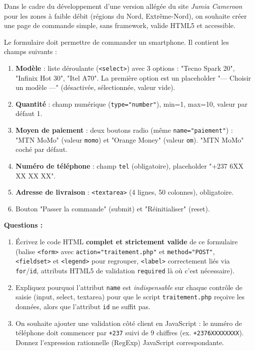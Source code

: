 \documentclass[11pt]{article}
\begin{document}
\begin{exercice}
\label{exo:bac_formulaire}
Dans le cadre du développement d'une version allégée du site \emph{Jumia Cameroon} pour les zones à faible débit (régions du Nord, Extrême-Nord), on souhaite créer une page de commande simple, sans framework, valide HTML5 et accessible.

Le formulaire doit permettre de commander un smartphone. Il contient les champs suivants :
\begin{enumerate}
    \item \textbf{Modèle} : liste déroulante (\texttt{<select>}) avec 3 options : "Tecno Spark 20", "Infinix Hot 30", "Itel A70". La première option est un placeholder "--- Choisir un modèle ---" (désactivée, sélectionnée, valeur vide).
    \item \textbf{Quantité} : champ numérique (\texttt{type="number"}), min=1, max=10, valeur par défaut 1.
    \item \textbf{Moyen de paiement} : deux boutons radio (même \texttt{name="paiement"}) : "MTN MoMo" (valeur \texttt{momo}) et "Orange Money" (valeur \texttt{om}). "MTN MoMo" coché par défaut.
    \item \textbf{Numéro de téléphone} : champ \texttt{tel} (obligatoire), placeholder "+237 6XX XX XX XX".
    \item \textbf{Adresse de livraison} : \texttt{<textarea>} (4 lignes, 50 colonnes), obligatoire.
    \item Bouton "Passer la commande" (submit) et "Réinitialiser" (reset).
\end{enumerate}

\textbf{Questions :}
\begin{enumerate}
    \item Écrivez le code HTML \textbf{complet et strictement valide} de ce formulaire (balise \texttt{<form>} avec \texttt{action="traitement.php"} et \texttt{method="POST"}, \texttt{<fieldset>} et \texttt{<legend>} pour regrouper, \texttt{<label>} correctement liés via \texttt{for}/\texttt{id}, attributs HTML5 de validation \texttt{required} là où c'est nécessaire).
    \item Expliquez pourquoi l'attribut \texttt{name} est \emph{indispensable} sur chaque contrôle de saisie (input, select, textarea) pour que le script \texttt{traitement.php} reçoive les données, alors que l'attribut \texttt{id} ne suffit pas.
    \item On souhaite ajouter une validation côté client en JavaScript : le numéro de téléphone doit commencer par \texttt{+237} suivi de 9 chiffres (ex. \texttt{+2376XXXXXXXX}). Donnez l'expression rationnelle (RegExp) JavaScript correspondante.
\end{enumerate}
\end{exercice}
\end{document}
